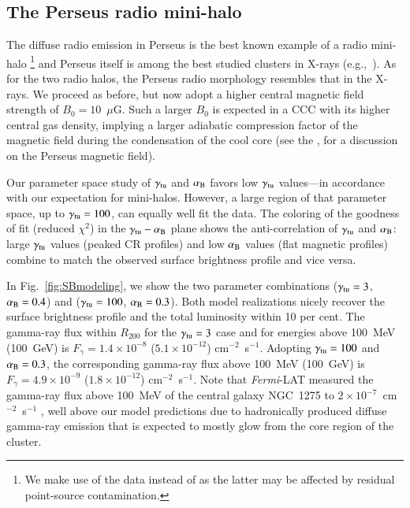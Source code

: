 \documentclass[useAMS,usenatbib]{mn2e}
\begin{document}
\subsection{The Perseus radio mini-halo}

The diffuse radio emission in Perseus is the best known example of a radio
mini-halo \citep{1990MNRAS.246..477P}\footnote{We make use of the
  \citet{1990MNRAS.246..477P} data instead of \citet{Sijbring1993} as the latter
  may be affected by residual point-source contamination.}  and Perseus itself
is among the best studied clusters in X-rays
(e.g.,~\citealp{2003ApJ...590..225C,2006MNRAS.366..417F,2011arXiv1105.5025F}). As
for the two radio halos, the Perseus radio morphology resembles that in the
X-rays. We proceed as before, but now adopt a higher central magnetic field
strength of $B_{0}=10$~$\mu$G. Such a larger $B_0$ is expected in a CCC with its
higher central gas density, implying a larger adiabatic compression factor of
the magnetic field during the condensation of the cool core (see the
\citealp{2010ApJ...710..634A,2011arXiv1111.5544M}, for a discussion on the
Perseus magnetic field).

Our parameter space study of $\gamma_{{\mathrm{tu}}}$ and $\alpha_{{\mathrm{B}}}$ favors
low $\gamma_{{\mathrm{tu}}}$ values---in accordance with our expectation for
mini-halos. However, a large region of that parameter space, up to
$\gamma_{{\mathrm{tu}}} = 100$, can equally well fit the data. The coloring of the
goodness of fit (reduced $\chi^2$) in the $\gamma_{{\mathrm{tu}}}-\alpha_{{\mathrm{B}}}$
plane shows the anti-correlation of $\gamma_{{\mathrm{tu}}}$ and $\alpha_{{\mathrm{B}}}$:
large $\gamma_{{\mathrm{tu}}}$ values (peaked CR profiles) and low $\alpha_{{\mathrm{B}}}$
values (flat magnetic profiles) combine to match the observed surface brightness
profile and vice versa.

In Fig.~\ref{fig:SBmodeling}, we show the two parameter combinations
($\gamma_{{\mathrm{tu}}}=3$, $\alpha_{{\mathrm{B}}}=0.4$) and ($\gamma_{{\mathrm{tu}}}=100$,
$\alpha_{{\mathrm{B}}}=0.3$). Both model realizations nicely recover the surface
brightness profile and the total luminosity within 10 per cent.  The gamma-ray
flux within $R_{200}$ for the $\gamma_{{\mathrm{tu}}}=3$ case and for energies above
100~MeV (100~GeV) is $F_{\gamma} = 1.4 \times 10^{-8}$ ($5.1 \times 10^{-12}$)
cm$^{-2}$~s$^{-1}$. Adopting $\gamma_{{\mathrm{tu}}}=100$ and $
\alpha_{{\mathrm{B}}}=0.3$, the corresponding gamma-ray flux above 100~MeV (100~GeV)
is $F_{\gamma} = 4.9 \times 10^{-9}$ ($1.8 \times 10^{-12}$)
cm$^{-2}$~s$^{-1}$. Note that \emph{Fermi}-LAT measured the gamma-ray flux above
100~MeV of the central galaxy NGC~1275 to $2 \times 10^{-7}$~cm$^{-2}$~s$^{-1}$
\citep{2009arXiv0904.1904T}, well above our model predictions due to
hadronically produced diffuse gamma-ray emission that is expected to mostly glow
from the core region of the cluster.
\end{document}
